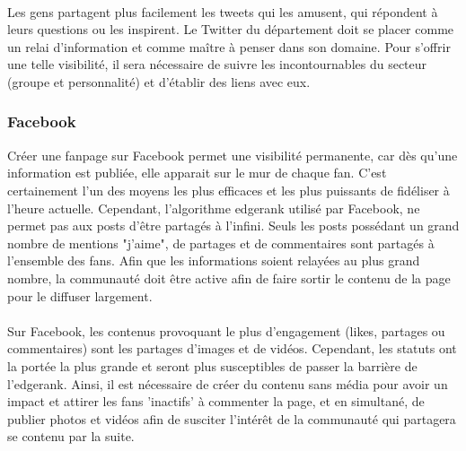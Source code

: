 \paragraph{}
Les gens partagent plus facilement les tweets qui les amusent, qui répondent à leurs questions ou les inspirent. Le Twitter du département doit se 
placer comme un relai d'information et comme maître à penser dans son domaine. Pour s'offrir une telle visibilité, il sera nécessaire de suivre les 
incontournables du secteur (groupe et personnalité) et d'établir des liens avec eux.
 
\subsubsection{Facebook}
Créer une fanpage sur Facebook permet une visibilité permanente, car dès qu'une information est publiée, elle apparait sur le mur de chaque fan. 
C'est certainement l'un des moyens les plus efficaces et les plus puissants de fidéliser à l'heure actuelle. Cependant, l'algorithme edgerank utilisé 
par Facebook, ne permet pas aux posts d'être partagés à l'infini. Seuls les posts possédant un grand nombre de mentions "j'aime", de partages et de 
commentaires sont partagés à l'ensemble des fans. Afin que les informations soient relayées au plus grand nombre, la communauté doit être active afin 
de faire sortir le contenu de la page pour le diffuser largement.

\paragraph{}
Sur Facebook, les contenus provoquant le plus d'engagement (likes, partages ou commentaires) sont les partages d'images et de vidéos. Cependant, les 
statuts ont la portée la plus grande et seront plus susceptibles de passer la barrière de l'edgerank. Ainsi, il est nécessaire de créer du contenu sans 
média pour avoir un impact et attirer les fans 'inactifs' à commenter la page, et en simultané, de publier photos et vidéos afin de susciter l'intérêt 
de la communauté qui partagera se contenu par la suite.
